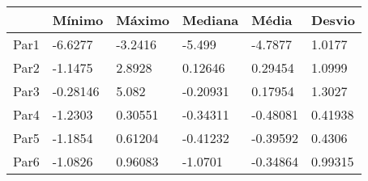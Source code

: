 \begin{tabular}{llllll}
& Mínimo & Máximo & Mediana & Média & Desvio \\ 
\hline 
Par1 & -6.6277 & -3.2416 & -5.499 & -4.7877 & 1.0177 \\ 
Par2 & -1.1475 & 2.8928 & 0.12646 & 0.29454 & 1.0999 \\ 
Par3 & -0.28146 & 5.082 & -0.20931 & 0.17954 & 1.3027 \\ 
Par4 & -1.2303 & 0.30551 & -0.34311 & -0.48081 & 0.41938 \\ 
Par5 & -1.1854 & 0.61204 & -0.41232 & -0.39592 & 0.4306 \\ 
Par6 & -1.0826 & 0.96083 & -1.0701 & -0.34864 & 0.99315 \\ 
\hline 
\end{tabular}